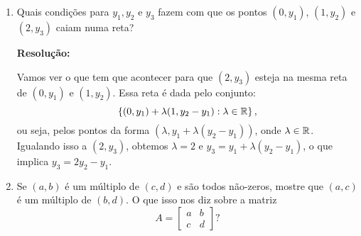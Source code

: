 \documentclass[leqno]{article}
\numberwithin{equation}{section}
\newenvironment{sol}
{
    \vspace{4mm}
    \noindent\textbf{Resolução:}
    \strut\newline
    \smallskip
    \hspace{-3.5mm}
}
{}
\begin{document}
\begin{enumerate}

%

\item Quais condições para $y_1, y_2$ e $y_3$ fazem com que os pontos $(0, y_1)$, $(1, y_2)$ e $(2, y_3)$ caiam numa reta?

\begin{sol} 
    Vamos ver o que tem que acontecer para que \( (2, y_{ 3 }) \) esteja na mesma reta de \( (0, y_{ 1 }) \) e \( ( 1, y_{ 2 } ) \).
    Essa reta é dada pelo conjunto:
    \begin{equation*}
        \left\{ (0, y_{ 1 }) + \lambda (1, y_{ 2 } - y_{ 1 }) : \lambda \in \mathbb{R} \right\}
    ,\end{equation*}
    ou seja, pelos pontos da forma \( ( \lambda, y_{ 1 } + \lambda ( y_{ 2 } - y_{ 1 } )) \), onde \( \lambda \in \mathbb{R} \).
    Igualando isso a \( ( 2, y_{ 3 } ) \), obtemos \( \lambda = 2 \) e \( y_{ 3 } = y_{ 1 } + \lambda ( y_{ 2 } - y_{ 1 } ) \), o que implica \( y_{ 3 } = 2 y_{ 2 } - y_{ 1 } \).
\end{sol} 

\item Se $(a,b)$ é um múltiplo de $(c,d)$ e são todos não-zeros, mostre que $(a,c)$ é um múltiplo de $(b,d)$. O que isso nos diz sobre a matriz
$$A = \begin{bmatrix}
a & b \\
c & d
\end{bmatrix}?$$ 


\end{enumerate}
\end{document}
